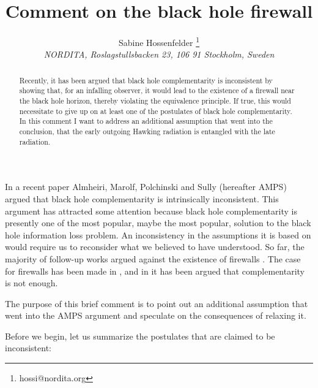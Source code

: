 \documentclass[12pt]{article}
\begin{document}
 
\title{Comment on the black hole firewall}
\author{Sabine Hossenfelder \thanks{hossi@nordita.org}\\
{\footnotesize{\sl NORDITA, Roslagstullsbacken 23, 106 91 Stockholm, Sweden}}}

\date{}
\maketitle
\vspace*{-1cm}
\begin{abstract}
Recently, it has been argued that black hole complementarity is inconsistent by
showing that, for an infalling observer, it would lead to the existence of a 
firewall near the black hole
horizon, thereby violating the equivalence principle. If true, this would necessitate
to give up on at least one of the postulates of black hole complementarity. In
this comment I want to address an additional assumption that went into the
conclusion, that the early outgoing Hawking radiation is entangled with the
late radiation. 
\end{abstract}



In a recent paper \cite{Almheiri:2012rt} Almheiri, Marolf, Polchinski and Sully (hereafter AMPS) argued
that black hole complementarity \cite{Susskind:1993if} is intrinsically inconsistent. This argument has attracted some
attention because black hole complementarity is presently one of the most popular, maybe the most popular,
solution to the black hole information loss problem. An inconsistency in the assumptions it is based
on would require us to reconsider what we believed to have understood. So far, the majority of follow-up works
argued against the existence of firewalls 
\cite{Nomura:2012sw,Mathur:2012jk,Chowdhury:2012vd,Bena:2012zi,Banks:2012nn,Ori:2012jx}.
The case for firewalls has been made in \cite{Susskind:2012rm}, and in \cite{Bousso:2012as} it has been 
argued that complementarity is not enough. 

The purpose of this brief comment is
to point out an additional assumption that went into the AMPS argument and speculate on the consequences
of relaxing it. 

Before we begin, let us summarize the postulates that are claimed to be inconsistent:
 
\end{document}
